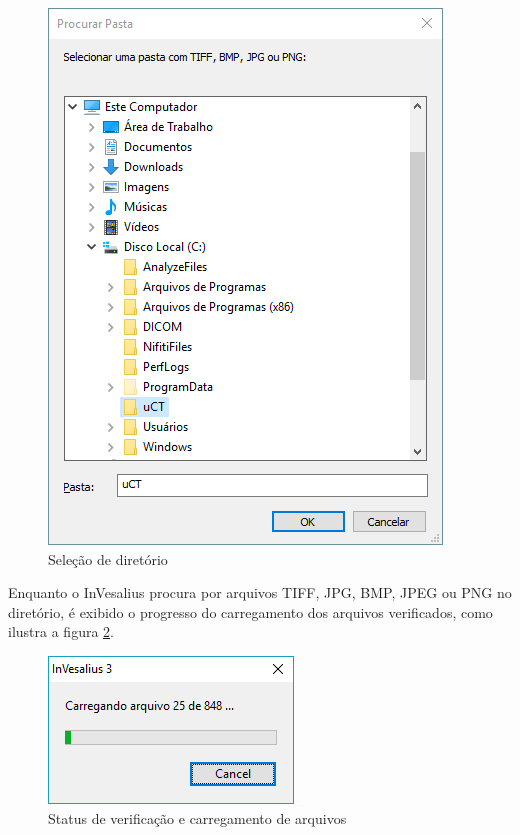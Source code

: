 \begin{figure}[!htb]
\centering
\includegraphics[scale=0.5]{../user_guide_figures/invesalius_screen/import_bmp_select_folder_pt.png}
\caption{Seleção de diretório}
\label{fig:import_bmp_select_folder}
\end{figure}


Enquanto o InVesalius procura por arquivos TIFF, JPG, BMP, JPEG ou PNG no diretório, é exibido o progresso do carregamento dos arquivos verificados, como ilustra a figura \ref{fig:import_bmp_load_pt}.

\begin{figure}[!htb]
\centering
\includegraphics[scale=0.6]{../user_guide_figures/invesalius_screen/import_bmp_load_pt.png}
\caption{Status de verificação e carregamento de arquivos}
\label{fig:import_bmp_load_pt}
\end{figure}


